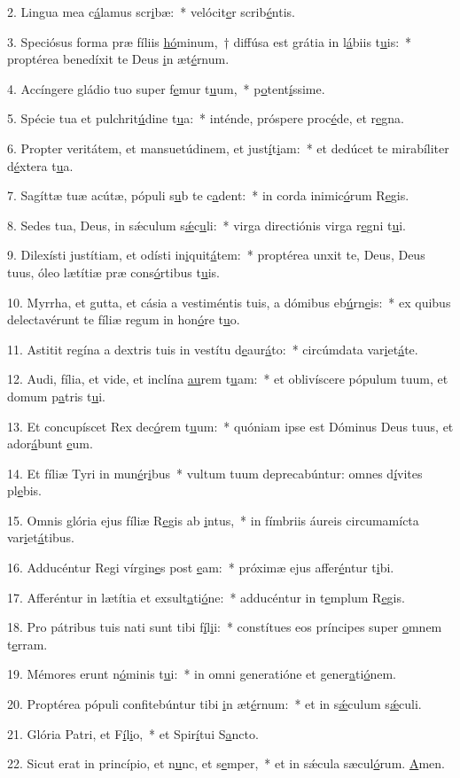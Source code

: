 2. Lingua mea c\uline{á}lamus scr\uline{i}bæ:~* velócit\uline{e}r scrib\uline{é}ntis.\par 
3. Speciósus forma præ fíliis \uline{hó}minum,~† diffúsa est grátia in l\uline{á}biis t\uline{u}is:~* proptérea benedíxit te Deus \uline{i}n æt\uline{é}rnum.\par 
4. Accíngere gládio tuo super f\uline{e}mur t\uline{u}um,~* p\uline{o}tent\uline{í}ssime.\par 
5. Spécie tua et pulchrit\uline{ú}dine t\uline{u}a:~* inténde, próspere proc\uline{é}de, et r\uline{e}gna.\par 
6. Propter veritátem, et mansuetúdinem, et just\uline{í}t\uline{i}am:~* et dedúcet te mirabíliter d\uline{é}xtera t\uline{u}a.\par 
7. Sagíttæ tuæ acútæ, pópuli s\uline{u}b te c\uline{a}dent:~* in corda inimic\uline{ó}rum R\uline{e}gis.\par 
8. Sedes tua, Deus, in sǽculum s\uline{ǽ}c\uline{u}li:~* virga directiónis virga r\uline{e}gni t\uline{u}i.\par 
9. Dilexísti justítiam, et odísti in\uline{i}quit\uline{á}tem:~* proptérea unxit te, Deus, Deus tuus, óleo lætítiæ præ cons\uline{ó}rtibus t\uline{u}is.\par 
10. Myrrha, et gutta, et cásia a vestiméntis tuis, a dómibus eb\uline{ú}rn\uline{e}is:~* ex quibus delectavérunt te fíliæ regum in hon\uline{ó}re t\uline{u}o.\par 
11. Astitit regína a dextris tuis in vestítu d\uline{e}aur\uline{á}to:~* circúmdata var\uline{i}et\uline{á}te.\par 
12. Audi, fília, et vide, et inclína \uline{au}rem t\uline{u}am:~* et oblivíscere pópulum tuum, et domum p\uline{a}tris t\uline{u}i.\par 
13. Et concupíscet Rex dec\uline{ó}rem t\uline{u}um:~* quóniam ipse est Dóminus Deus tuus, et ador\uline{á}bunt \uline{e}um.\par 
14. Et fíliæ Tyri in mun\uline{é}r\uline{i}bus~* vultum tuum deprecabúntur: omnes d\uline{í}vites pl\uline{e}bis.\par 
15. Omnis glória ejus fíliæ R\uline{e}gis ab \uline{i}ntus,~* in fímbriis áureis circumamícta var\uline{i}et\uline{á}tibus.\par 
16. Adducéntur Regi vírgin\uline{e}s post \uline{e}am:~* próximæ ejus affer\uline{é}ntur t\uline{i}bi.\par 
17. Afferéntur in lætítia et exsult\uline{a}ti\uline{ó}ne:~* adducéntur in t\uline{e}mplum R\uline{e}gis.\par 
18. Pro pátribus tuis nati sunt tibi f\uline{í}l\uline{i}i:~* constítues eos príncipes super \uline{o}mnem t\uline{e}rram.\par 
19. Mémores erunt n\uline{ó}minis t\uline{u}i:~* in omni generatióne et gener\uline{a}ti\uline{ó}nem.\par 
20. Proptérea pópuli confitebúntur tibi \uline{i}n æt\uline{é}rnum:~* et in s\uline{ǽ}culum s\uline{ǽ}culi.\par 
21. Glória Patri, et F\uline{í}l\uline{i}o,~* et Spir\uline{í}tui S\uline{a}ncto.\par 
22. Sicut erat in princípio, et n\uline{u}nc, et s\uline{e}mper,~* et in sǽcula sæcul\uline{ó}rum. \uline{A}men.\par 
